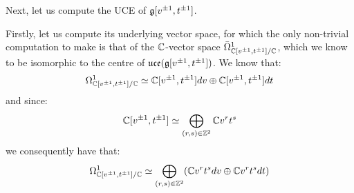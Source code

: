         \begin{example} \label{example: toroidal_lie_algebras_centres}
            Next, let us compute the UCE of $\mathfrak{g}[v^{\pm 1}, t^{\pm 1}]$. 
            
            Firstly, let us compute its underlying vector space, for which the only non-trivial computation to make is that of the $\mathbb{C}$-vector space $\bar{\Omega}^1_{\mathbb{C}[v^{\pm 1}, t^{\pm 1}]/\mathbb{C}}$, which we know to be isomorphic to the centre of $\mathfrak{uce}(\mathfrak{g}[v^{\pm 1}, t^{\pm 1}])$. We know that:
                $$\Omega^1_{\mathbb{C}[v^{\pm 1}, t^{\pm 1}]/\mathbb{C}} \simeq \mathbb{C}[v^{\pm 1}, t^{\pm 1}] dv \oplus \mathbb{C}[v^{\pm 1}, t^{\pm 1}] dt$$
            and since:
                $$\mathbb{C}[v^{\pm 1}, t^{\pm 1}] \simeq \bigoplus_{(r, s) \in \mathbb{Z}^2} \mathbb{C}  v^r t^s$$
            we consequently have that:
                $$\Omega^1_{\mathbb{C}[v^{\pm 1}, t^{\pm 1}]/\mathbb{C}} \simeq \bigoplus_{(r, s) \in \mathbb{Z}^2} (\mathbb{C} v^r t^s dv \oplus \mathbb{C} v^r t^s dt)$$
            

\end{example}
